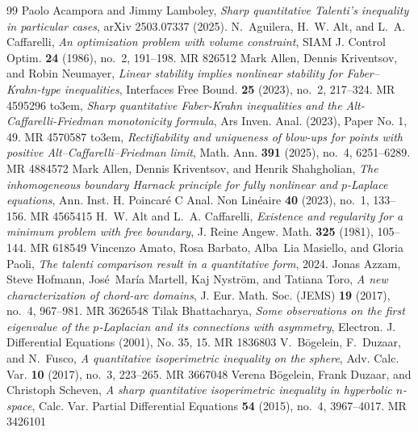 \documentclass[10pt,a4paper]{amsart}
\numberwithin{equation}{section}
\providecommand{\bysame}{\leavevmode\hbox to3em{\hrulefill}\thinspace}
\providecommand{\MR}{\relax\ifhmode\unskip\space\fi MR }
\begin{document}
\begin{thebibliography}{99}
 Paolo Acampora and Jimmy Lamboley, \emph{Sharp quantitative {T}alenti's inequality in particular cases}, arXiv 2503.07337 (2025).
 N.~Aguilera, H.~W. Alt, and L.~A. Caffarelli, \emph{An optimization problem with volume constraint}, SIAM J. Control Optim. \textbf{24} (1986), no.~2, 191--198. \MR{826512}
 Mark Allen, Dennis Kriventsov, and Robin Neumayer, \emph{Linear stability implies nonlinear stability for {F}aber--{K}rahn-type inequalities}, Interfaces Free Bound. \textbf{25} (2023), no.~2, 217--324. \MR{4595296}
 \bysame, \emph{Sharp quantitative {F}aber-{K}rahn inequalities and the {A}lt-{C}affarelli-{F}riedman monotonicity formula}, Ars Inven. Anal. (2023), Paper No. 1, 49. \MR{4570587}
 \bysame, \emph{Rectifiability and uniqueness of blow-ups for points with positive {A}lt--{C}affarelli--{F}riedman limit}, Math. Ann. \textbf{391} (2025), no.~4, 6251--6289. \MR{4884572}
 Mark Allen, Dennis Kriventsov, and Henrik Shahgholian, \emph{The inhomogeneous boundary {H}arnack principle for fully nonlinear and {$p$}-{L}aplace equations}, Ann. Inst. H. Poincar\'e{} C Anal. Non Lin\'eaire \textbf{40} (2023), no.~1, 133--156. \MR{4565415}
 H.~W. Alt and L.~A. Caffarelli, \emph{Existence and regularity for a minimum problem with free boundary}, J. Reine Angew. Math. \textbf{325} (1981), 105--144. \MR{618549}
 Vincenzo Amato, Rosa Barbato, Alba~Lia Masiello, and Gloria Paoli, \emph{The talenti comparison result in a quantitative form}, 2024.
 Jonas Azzam, Steve Hofmann, Jos\'e{}~Mar\'ia Martell, Kaj Nystr\"om, and Tatiana Toro, \emph{A new characterization of chord-arc domains}, J. Eur. Math. Soc. (JEMS) \textbf{19} (2017), no.~4, 967--981. \MR{3626548}
 Tilak Bhattacharya, \emph{Some observations on the first eigenvalue of the {$p$}-{L}aplacian and its connections with asymmetry}, Electron. J. Differential Equations (2001), No. 35, 15. \MR{1836803}
 V.~B\"{o}gelein, F.~Duzaar, and N.~Fusco, \emph{A quantitative isoperimetric inequality on the sphere}, Adv. Calc. Var. \textbf{10} (2017), no.~3, 223--265. \MR{3667048}
 Verena B\"{o}gelein, Frank Duzaar, and Christoph Scheven, \emph{A sharp quantitative isoperimetric inequality in hyperbolic {$n$}-space}, Calc. Var. Partial Differential Equations \textbf{54} (2015), no.~4, 3967--4017. \MR{3426101}

\end{thebibliography}
\end{document}
